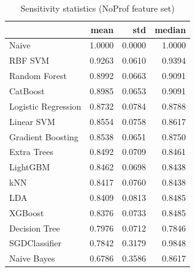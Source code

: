 \begin{table}
\caption{Sensitivity statistics (NoProf feature set)}
\label{tab:sensitivity_NoProf_stats}
\begin{tabular}{lrrr}
\toprule
 & mean & std & median \\
\midrule
Naive & 1.0000 & 0.0000 & 1.0000 \\
RBF SVM & 0.9263 & 0.0610 & 0.9394 \\
Random Forest & 0.8992 & 0.0663 & 0.9091 \\
CatBoost & 0.8985 & 0.0653 & 0.9091 \\
Logistic Regression & 0.8732 & 0.0784 & 0.8788 \\
Linear SVM & 0.8554 & 0.0758 & 0.8617 \\
Gradient Boosting & 0.8538 & 0.0651 & 0.8750 \\
Extra Trees & 0.8492 & 0.0709 & 0.8461 \\
LightGBM & 0.8462 & 0.0698 & 0.8438 \\
kNN & 0.8417 & 0.0760 & 0.8438 \\
LDA & 0.8409 & 0.0813 & 0.8485 \\
XGBoost & 0.8376 & 0.0733 & 0.8485 \\
Decision Tree & 0.7976 & 0.0712 & 0.7846 \\
SGDClassifier & 0.7842 & 0.3179 & 0.9848 \\
Naive Bayes & 0.6786 & 0.3586 & 0.8617 \\
\bottomrule
\end{tabular}
\end{table}
